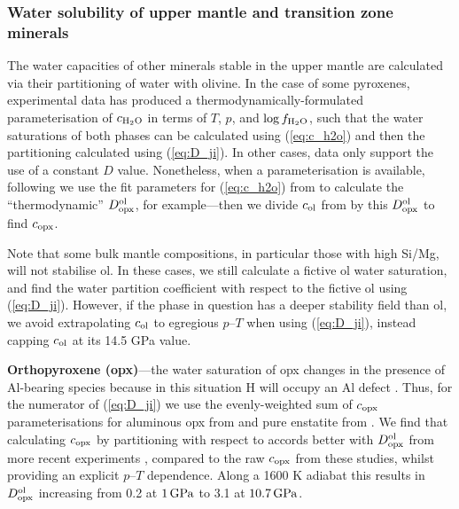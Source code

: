 \documentclass[fleqn,usenatbib]{mnras}
\begin{document}
\subsubsection{Water solubility of upper mantle and transition zone minerals}

The water capacities of other minerals stable in the upper mantle are calculated via their partitioning of water with olivine. In the case of some pyroxenes, experimental data has produced a thermodynamically-formulated parameterisation of $c_{\rm H_2O}$ in terms of $T$, $p$, and $\log f_{\rm H_2O}$, such that the water saturations of both phases can be calculated using (\ref{eq:c_h2o}) and then the partitioning calculated using (\ref{eq:D_ji}). In other cases, data only support the use of a constant $D$ value. Nonetheless, when a parameterisation is available, following \citet{dong_constraining_2021} we use the fit parameters for (\ref{eq:c_h2o}) from \citet{kohlstedt_solubility_1996} to calculate the ``thermodynamic'' $D^{\rm ol}_{\rm opx}$, for example---then we divide $c_{\rm ol}$ from \citet{dong_constraining_2021} by this $D^{\rm ol}_{\rm opx}$ to find $c_{\rm opx}$. %

Note that some bulk mantle compositions, in particular those with high Si/Mg, will not stabilise ol. In these cases, we still calculate a fictive ol water saturation, and find the water partition coefficient with respect to the fictive ol using (\ref{eq:D_ji}). However, if the phase in question has a deeper stability field than ol, we avoid extrapolating $c_{\rm ol}$ to egregious $p$--$T$ when using (\ref{eq:D_ji}), instead capping $c_{\rm ol}$ at its 14.5 GPa value.

\textbf{Orthopyroxene (opx)}---the water saturation of opx changes in the presence of Al-bearing species because in this situation H will occupy an Al defect \citep{keppler_thermodynamics_2006}. Thus, for the numerator of (\ref{eq:D_ji}) we use the evenly-weighted sum of $c_{\rm opx}$ parameterisations for aluminous opx from \citet{mierdel_water_2007} and pure enstatite from \citet{mierdel_temperature_2004}. We find that calculating $c_{\rm opx}$ by partitioning with respect to \citet{kohlstedt_solubility_1996} accords better with $D^{\rm ol}_{\rm opx}$ from more recent experiments \citep{ferot_water_2012, demouchy_subsolidus_2017}, compared to the raw $c_{\rm opx}$ from these studies, whilst providing an explicit $p$--$T$ dependence. Along a 1600 K adiabat this results in $D^{\rm ol}_{\rm opx}$ increasing from 0.2 at $1\,{\rm GPa}$ to 3.1 at $10.7\,{\rm GPa}$.
\end{document}
